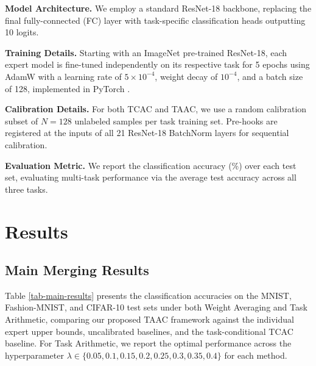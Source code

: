 \documentclass{article}
\theoremstyle{plain}
\theoremstyle{definition}
\theoremstyle{remark}
\begin{document}
\textbf{Model Architecture.} We employ a standard ResNet-18 \cite{he2016resnet} backbone, replacing the final fully-connected (FC) layer with task-specific classification heads outputting 10 logits.

\textbf{Training Details.} Starting with an ImageNet \cite{deng2009imagenet} pre-trained ResNet-18, each expert model is fine-tuned independently on its respective task for 5 epochs using AdamW \cite{loshchilov2019adamw} with a learning rate of $5 \times 10^{-4}$, weight decay of $10^{-4}$, and a batch size of 128, implemented in PyTorch \cite{paszke2019pytorch}.

\textbf{Calibration Details.} For both TCAC and TAAC, we use a random calibration subset of $N = 128$ unlabeled samples per task training set. Pre-hooks are registered at the inputs of all 21 ResNet-18 BatchNorm layers for sequential calibration.

\textbf{Evaluation Metric.} We report the classification accuracy (\%) over each test set, evaluating multi-task performance via the average test accuracy across all three tasks.

\section{Results}
\label{submission-results}

\subsection{Main Merging Results}
Table \ref{tab-main-results} presents the classification accuracies on the MNIST, Fashion-MNIST, and CIFAR-10 test sets under both Weight Averaging and Task Arithmetic, comparing our proposed TAAC framework against the individual expert upper bounds, uncalibrated baselines, and the task-conditional TCAC baseline. For Task Arithmetic, we report the optimal performance across the hyperparameter $\lambda \in \{0.05, 0.1, 0.15, 0.2, 0.25, 0.3, 0.35, 0.4\}$ for each method.
\end{document}
